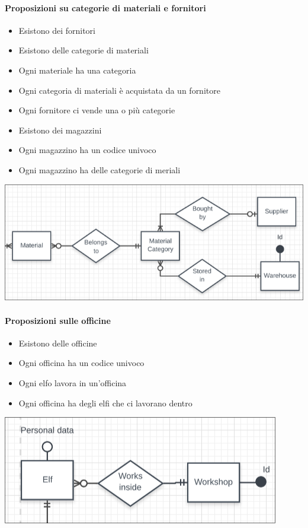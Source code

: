 \documentclass[12pt]{report}
\begin{document}
\paragraph{Proposizioni su categorie di materiali e fornitori}
\begin{itemize}
  \item Esistono dei fornitori
  \item Esistono delle categorie di materiali
  \item Ogni materiale ha una categoria
  \item Ogni categoria di materiali è acquistata da un fornitore
  \item Ogni fornitore ci vende una o più categorie
  \item Esistono dei magazzini
  \item Ogni magazzino ha un codice univoco
  \item Ogni magazzino ha delle categorie di meriali
\end{itemize}
\begin{center}
\includegraphics[scale=0.50]{er5.png}
\end{center}

\paragraph{Proposizioni sulle officine}
\begin{itemize}
  \item Esistono delle officine
  \item Ogni officina ha un codice univoco
  \item Ogni elfo lavora in un'officina
  \item Ogni officina ha degli elfi che ci lavorano dentro
\end{itemize}
\begin{center}
\includegraphics[scale=0.70]{er6.png}
\end{center}
\end{document}
